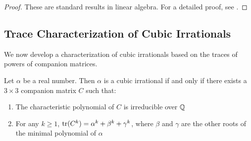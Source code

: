 \begin{proof}
These are standard results in linear algebra. For a detailed proof, see \cite{Horn2012}.
\end{proof}

\subsection{Trace Characterization of Cubic Irrationals}

We now develop a characterization of cubic irrationals based on the traces of powers of companion matrices.

\begin{theorem}\label{thm:matrix_cubic}
Let $\alpha$ be a real number. Then $\alpha$ is a cubic irrational if and only if there exists a $3 \times 3$ companion matrix $C$ such that:
\begin{enumerate}
    \item The characteristic polynomial of $C$ is irreducible over $\mathbb{Q}$
    \item For any $k \geq 1$, $\operatorname{tr}(C^k) = \alpha^k + \beta^k + \gamma^k$, where $\beta$ and $\gamma$ are the other roots of the minimal polynomial of $\alpha$
\end{enumerate}
\end{theorem}

